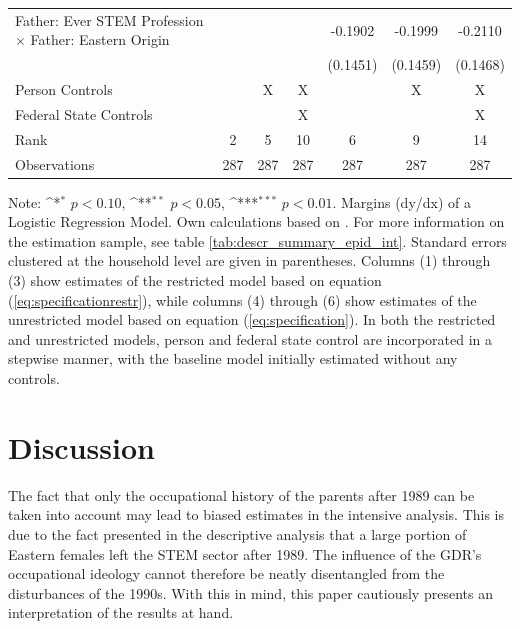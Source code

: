 \documentclass[a4paper, oneside, hyperfootnotes = false]{article}
\def\sym#1{\ifmmode^{#1}\else\(^{#1}\)\fi}
\begin{document}
{\begin{landscape}
\begin{table}[ht]
\begin{center}
{\begin{tabular}{l*{6}{c}}
					\addlinespace
					Father: Ever STEM Profession $\times$ Father: Eastern Origin&                     &                     &                     &     -0.1902         &     -0.1999         &     -0.2110         \\
					&                     &                     &                     &    (0.1451)         &    (0.1459)         &    (0.1468)         \\
					\midrule
					Person Controls & & X  & X & & X & X \\
					Federal State Controls & & & X & & & X \\
					Rank                &      2         &      5         &     10         &      6         &      9         &     14         \\
					Observations &    287         &    287         &    287         &    287         &    287         &    287         \\
					\bottomrule
			\end{tabular}}
			
			\vspace{2mm}
			
			\parbox{15cm}{
				\linespread{1}\footnotesize Note: \sym{*} \(p<0.10\), \sym{**} \(p<0.05\), \sym{***} \(p<0.01\). Margins (dy/dx) of a Logistic Regression Model. Own calculations based on \cite{SOEP2023}. For more information on the estimation sample, see table \ref{tab:descr_summary_epid_int}. Standard errors clustered at the household level are given in parentheses. Columns (1) through (3) show estimates of the restricted model based on equation (\ref{eq:specificationrestr}), while columns (4) through (6) show estimates of the unrestricted model based on equation (\ref{eq:specification}). In both the restricted and unrestricted models, person and federal state control are incorporated in a stepwise manner, with the baseline model initially estimated without any controls.}
			
		\end{center}
	\end{table}
\end{landscape}

\section{Discussion}
\label{discussion}

The fact that only the occupational history of the parents after 1989 can be taken into account may lead to biased estimates in the intensive analysis. This is due to the fact presented in the descriptive analysis that a large portion of Eastern females left the STEM sector after 1989. The influence of the GDR's occupational ideology cannot therefore be neatly disentangled from the disturbances of the 1990s. With this in mind, this paper cautiously presents an interpretation of the results at hand.

}
\end{document}
